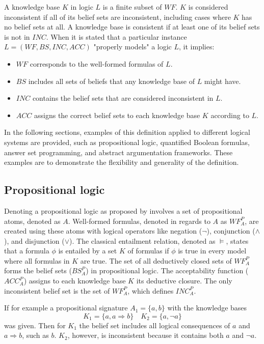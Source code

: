 A knowledge base \(K\) in logic \(L\) is a finite subset of \(WF\).
\(K\) is considered inconsistent if all of its belief sets are inconsistent, including cases where \(K\) has no belief sets at all.
A knowledge base is consistent if at least one of its belief sets is not in \(INC\).
When it is stated that a particular instance \(L = (WF, BS, INC, ACC)\) "properly models" a logic \(L\), it implies:
\begin{itemize}
      \item \(WF\) corresponds to the well-formed formulas of \(L\).
      \item \(BS\) includes all sets of beliefs that any knowledge base of \(L\) might have.
      \item \(INC\) contains the belief sets that are considered inconsistent in \(L\).
      \item \(ACC\) assigns the correct belief sets to each knowledge base \(K\) according to \(L\).
\end{itemize}

In the following sections, examples of this definition applied to different logical systems are provided, such as propositional logic, quantified Boolean formulas, answer set programming, and abstract argumentation frameworks. These examples are to demonstrate the flexibility and generality of the definition.

\subsection{Propositional logic}
Denoting a propositional logic as proposed by \cite{gelfond_classical_1991} involves a set of propositional atoms, denoted as \(A\).
Well-formed formulas, denoted in regards to \(A\) as \(WF^P_A\), are created using these atoms with logical operators like negation (\(\neg\)), conjunction (\(\land\)), and disjunction (\(\lor\)).
The classical entailment relation, denoted as \(\models\), states that a formula \(\phi\) is entailed by a set \(K\) of formulas if \(\phi\) is true in every model where all formulas in \(K\) are true.
The set of all deductively closed sets of \(WF^P_A\) forms the belief sets (\(BS^P_A\)) in propositional logic.
The acceptability function (\(ACC^P_A\)) assigns to each knowledge base \(K\) its deductive closure.
The only inconsistent belief set is the set of \(WF^P_A\), which defines \(INC^P_A\).

If for example a propositional signature \(A_1 = \{a,b\}\) with the knowledge bases
\[K_1 = \{a, a \Rightarrow b\} \quad K_2 = \{a, \neg a\}\]
was given. Then for \(K_1\) the belief set includes all logical consequences of \(a\) and \(a \Rightarrow b\), such as \(b\).
\(K_2\), however, is inconsistent because it contains both \(a\) and \(\neg a\).

